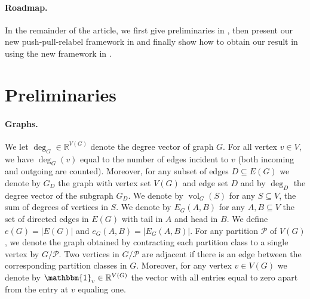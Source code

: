 \documentclass[11pt]{article}
\newcommand\R{\mathbb{R}}
\DeclareMathOperator{\vol}{vol}
\begin{document}
\paragraph{Roadmap.} In the remainder of the article, we first give preliminaries in , then present our new push-pull-relabel framework in  and finally show how to obtain our result in  using the new framework in .

\section{Preliminaries}
\label{sec:prelim}

\paragraph{Graphs.} We let $\deg_G \in \R^{V(G)}$ denote the degree vector of graph $G$. For all vertex $v \in V$, we have $\deg_G(v)$ equal to the number of edges incident to $v$ (both incoming and outgoing are counted). Moreover, for any subset of edges $D \subseteq E(G)$ we denote by $G_{D}$ the graph with vertex set $V(G)$ and edge set $D$ and by $\deg_D$ the degree vector of the subgraph $G_{D}$. We denote by $\vol_G(S)$ for any $S \subseteq V$, the sum of degrees of vertices in $S$. We denote by $E_G(A, B)$ for any $A, B \subseteq V$ the set of directed edges in $E(G)$ with tail in $A$ and head in $B$. We define $e(G) = |E(G)|$ and $e_G(A,B) = |E_G(A,B)|$. For any partition $\mathcal{P}$ of $V(G)$, we denote the graph obtained by contracting each partition class to a single vertex by $G/\mathcal{P}$. Two vertices in $G/\mathcal{P}$ are adjacent if there is an edge between the corresponding partition classes in $G$. Moreover, for any vertex $v \in V(G)$ we denote by $\mathbbm{1}_v \in \R^{V(G)}$ the vector with all entries equal to zero apart from the entry at $v$ equaling one. 
\end{document}
